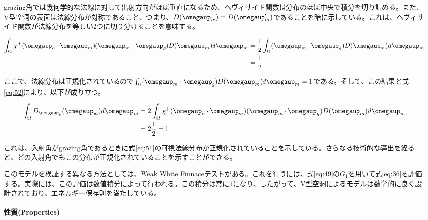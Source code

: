\documentclass[a4j,xelatex,ja=standard]{bxjsarticle}
\begin{document}
grazing角では幾何学的な法線に対して出射方向がほぼ垂直になるため、ヘヴィサイド関数は分布のほぼ中央で積分を切り詰める。また、V型空洞の表面は法線分布が対称であること、つまり、$D(\boldsymbol{\omegaup}_m) = D(\boldsymbol{\omegaup}_m')$であることを暗に示している。これは、ヘヴィサイド関数が法線分布を等しい2つに切り分けることを意味する。

\begin{equation}
    \begin{split}
        \int_{\Omega} \chi^+(\boldsymbol{\omegaup}_o \cdot \boldsymbol{\omegaup}_m) (\boldsymbol{\omegaup}_m \cdot \boldsymbol{\omegaup}_g) D(\boldsymbol{\omegaup}_m) d\boldsymbol{\omegaup}_m
        &= \frac{1}{2} \int_{\Omega} (\boldsymbol{\omegaup}_m \cdot \boldsymbol{\omegaup}_g) D(\boldsymbol{\omegaup}_m) d\boldsymbol{\omegaup}_m \\
        &= \frac{1}{2}
    \end{split}
    \label{eq:53}
\end{equation}

ここで、法線分布は正規化されているので$\int_{\Omega} (\boldsymbol{\omegaup}_m \cdot \boldsymbol{\omegaup}_g) D(\boldsymbol{\omegaup}_m) d\boldsymbol{\omegaup}_m = 1$である。そして、この結果と式\eqref{eq:52}により、以下が成り立つ。

\begin{equation}
    \begin{split}
        \int_{\Omega} D_{\boldsymbol{\omegaup}_o}(\boldsymbol{\omegaup}_m) d\boldsymbol{\omegaup}_m
        &= 2 \int_{\Omega} \chi^+(\boldsymbol{\omegaup}_o \cdot \boldsymbol{\omegaup}_m) (\boldsymbol{\omegaup}_m \cdot \boldsymbol{\omegaup}_g) D(\boldsymbol{\omegaup}_m) d\boldsymbol{\omegaup}_m \\
        &= 2 \frac{1}{2} = 1
    \end{split}
    \label{eq:54}
\end{equation}

これは、入射角がgrazing角であるときに式\eqref{eq:51}の可視法線分布が正規化されていることを示している。さらなる技術的な導出を経ると、どの入射角でもこの分布が正規化されていることを示すことができる。

このモデルを検証する異なる方法としては、Weak White Furnaceテストがある。これを行うには、式\eqref{eq:49}の$G_1$を用いて式\eqref{eq:36}を評価する。実際には、この評価は数値積分によって行われる。この積分は常に$1$になり、したがって、V型空洞によるモデルは数学的に良く設計されており、エネルギー保存則を満たしている。

\paragraph{性質(Properties)}
\end{document}
